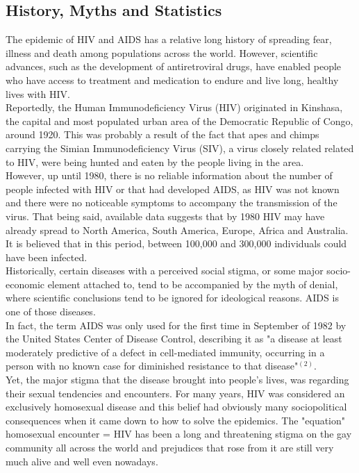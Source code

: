 \subsection{History, Myths and Statistics}
The epidemic of HIV and AIDS has a relative long history of spreading fear, illness and death among populations across the world. However, scientific advances, such as the development of antiretroviral drugs, have enabled people who have access to treatment and medication to endure and live long, healthy lives with HIV.\\
Reportedly, the Human Immunodeficiency Virus (HIV) originated in Kinshasa, the capital and most populated urban area of the Democratic Republic of Congo, around 1920. This was probably a result of the fact that apes and chimps carrying the Simian Immunodeficiency Virus (SIV), a virus closely related related to HIV, were being hunted and eaten by the people living in the area.\\
However, up until 1980, there is no reliable information about the number of people infected with HIV or that had developed AIDS, as HIV was not known and there were no noticeable symptoms to accompany the transmission of the virus. That being said, available data suggests that by 1980 HIV may have already spread to North America, South America, Europe, Africa and Australia. It is believed that in this period, between 100,000 and 300,000 individuals could have been infected.\\
Historically, certain diseases  with a perceived social stigma, or some major socio-economic element attached to, tend to be accompanied by the myth of denial, where scientific conclusions tend to be ignored for ideological reasons. AIDS is one of those diseases.\\
In fact, the term AIDS was only used for the first time in September of 1982 by the United States Center of Disease Control, describing it as "a disease at least moderately predictive of a defect in cell-mediated immunity, occurring in a person with no known case for diminished resistance to that disease"$^{(2)}$.\\
Yet, the major stigma that the disease brought into people's lives, was regarding their sexual tendencies and encounters. For many years, HIV was considered an exclusively homosexual disease and this belief had obviously many sociopolitical consequences when it came down to how to solve the epidemics. The "equation" homosexual encounter = HIV has been a long and threatening stigma on the gay community all across the world and prejudices that rose from it are still very much alive and well even nowadays.\\ 
